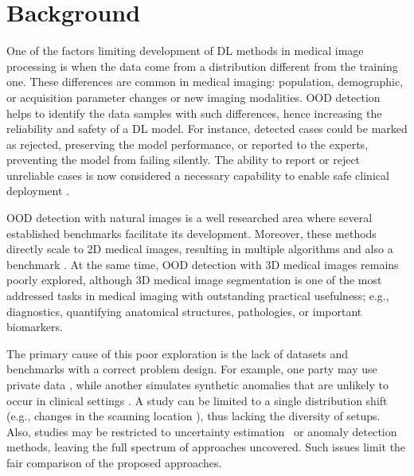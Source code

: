 \section{Background}


One of the factors limiting development of DL methods in medical image processing is when the data come from a distribution different from the training one. These differences are common in medical imaging: population, demographic, or acquisition parameter changes or new imaging modalities. OOD detection helps to identify the data samples with such differences, hence increasing the reliability and safety of a DL model. For instance, detected cases could be marked as rejected, preserving the model performance, or reported to the experts, preventing the model from failing silently. The ability to report or reject unreliable cases is now considered a necessary capability to enable safe clinical deployment \cite{kompa2021second}.

OOD detection with natural images is a well researched area \cite{yang2024generalized} where several established benchmarks \cite{hendrycks2016baseline,basart2022scaling} facilitate its development. Moreover, these methods directly scale to 2D medical images, resulting in multiple algorithms \cite{mahmood2020multiscale,pacheco2020out,berger2021confidence} and also a benchmark \cite{cao2020benchmark}. At the same time, OOD detection with 3D medical images remains poorly explored, although 3D medical image segmentation is one of the most addressed tasks in medical imaging \cite{medim_dl_survey_2017} with outstanding practical usefulness; e.g., diagnostics, quantifying anatomical structures, pathologies, or important biomarkers.

The primary cause of this poor exploration is the lack of datasets and benchmarks with a correct problem design. For example, one party may use private data \cite{karimi2022improving}, while another simulates synthetic anomalies that are unlikely to occur in clinical settings \cite{david_zimmerer_2022_6362313}. A study can be limited to a single distribution shift (e.g., changes in the scanning location \cite{karimi2022improving}), thus lacking the diversity of setups. Also, studies may be restricted to uncertainty estimation~\cite{lambert2022improving} or anomaly detection \cite{david_zimmerer_2022_6362313} methods, leaving the full spectrum of approaches uncovered. Such issues limit the fair comparison of the proposed approaches.

